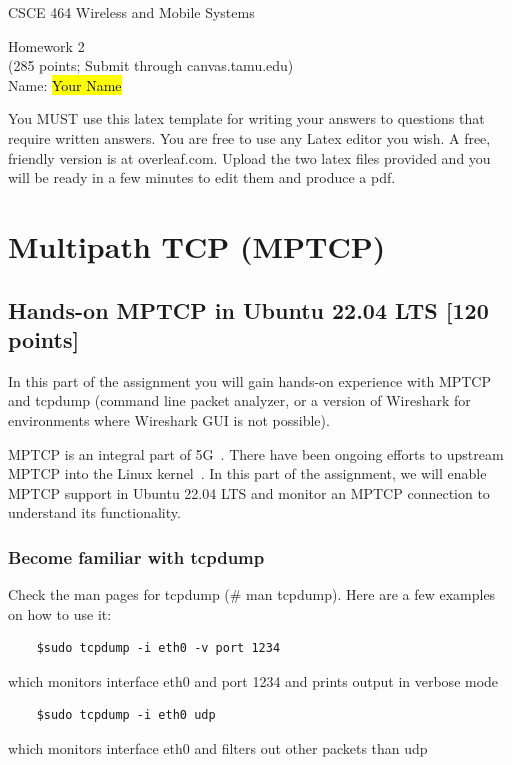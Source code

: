 \documentclass[11pt]{article}
\begin{document}
\newcommand{\answer}[1]{{\newline \hl{Answer:} #1}}

{\large  CSCE 464 Wireless and Mobile Systems  \hfill \\
 \begin{center}
   Homework 2 \\
   (285 points; Submit through canvas.tamu.edu) \\ 
   Name: \hl{Your Name}
    \end{center}
}

You MUST use this latex template for writing your answers to questions that require written answers. You are free to use any Latex editor you wish. A free, friendly version is at overleaf.com. Upload the two latex files provided and you will be ready in a few minutes to edit them and produce a pdf.


\section{Multipath TCP (MPTCP)}

\subsection{Hands-on MPTCP in Ubuntu 22.04 LTS [120 points]}
In this part of the assignment you will gain hands-on experience with MPTCP and tcpdump (command line packet analyzer, or a version of Wireshark for environments where Wireshark GUI is not possible).

MPTCP is an integral part of 5G~\cite{understanding5G}. There have been ongoing efforts to upstream MPTCP into the Linux kernel~\cite{linuxkernel}. In this part of the assignment, we will enable MPTCP support in Ubuntu 22.04 LTS and monitor an MPTCP connection to understand its functionality. 

\subsubsection{Become familiar with tcpdump}
Check the man pages for tcpdump (\# man tcpdump). Here are a few examples on how to use it:

\begin{verbatim}
    $sudo tcpdump -i eth0 -v port 1234
\end{verbatim}
which monitors interface eth0 and port 1234 and prints output in verbose mode

\begin{verbatim}
    $sudo tcpdump -i eth0 udp
\end{verbatim}
which monitors interface eth0 and filters out other packets than udp
\end{document}
